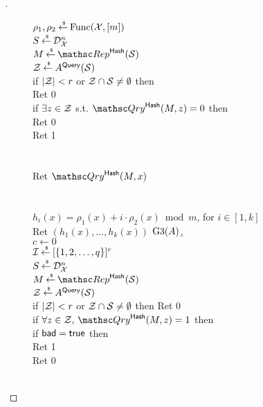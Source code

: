 \begin{proof}[]
\begin{figure}
{{$\rho_1,\rho_2 {\:\stackrel{{\scriptscriptstyle \hspace{0.2em}\$}} {\leftarrow}\:} \mathrm{Func}({\cal X},[m])$\\
$S {\:\stackrel{{\scriptscriptstyle \hspace{0.2em}\$}} {\leftarrow}\:} \mathcal{D}_{{\cal X}}^{n}$\\
$M \getsr \Rep^{\HashOracle}(\calS)$\\
${\cal Z} {\:\stackrel{{\scriptscriptstyle \hspace{0.2em}\$}} {\leftarrow}\:} A^{\mathsf{Query}}({\cal S})$\\
if $|{\cal Z}| < r$ or ${\cal Z} \cap {\cal S} \neq \emptyset$ then \\
\nudge Ret 0\\
if $\exists z \in {\cal Z}$ s.t. $\Qry^{\HashOracle}(M,z)=0$ then\\
\nudge Ret 0\\
Ret 1\\\\
%
\\
Ret $\Qry^{\HashOracle}(M,x)$\\\\
%
\\
$h_i(x) = \rho_1(x)+i \cdot \rho_2(x) \bmod m$, for $i\in[1,k]$\\
Ret $\left(h_1(x),\ldots,h_k(x)\right)$
}
{
\underline{{$\text{G3}(A)$},}\\
$c \gets 0$\\
$\mathcal{I}{\:\stackrel{{\scriptscriptstyle \hspace{0.2em}\$}} {\leftarrow}\:} [\{1,2,\ldots,q\}]^r$\\
$S {\:\stackrel{{\scriptscriptstyle \hspace{0.2em}\$}} {\leftarrow}\:} \mathcal{D}_{{\cal X}}^{n}$\\
$M \getsr \Rep^{\HashOracle}(\calS)$\\
${\cal Z} {\:\stackrel{{\scriptscriptstyle \hspace{0.2em}\$}} {\leftarrow}\:} A^{\mathsf{Query}}({\cal S})$\\
if $|{\cal Z}| < r$ or ${\cal Z} \cap {\cal S} \neq \emptyset$ then Ret 0\\
if $\forall z \in \calZ,\,\Qry^{\HashOracle}(M,z)=1$ then \\
\nudge if $\mathsf{bad}=\mathsf{true}$ then \\
\nudge Ret 1\\
Ret 0\\\\
}}
\end{figure}
\end{proof}
